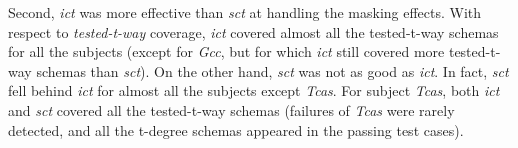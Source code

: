 \documentclass[10pt,journal,compsoc]{IEEEtran}
\begin{document}
Second, \emph{ict} was more effective than \emph{sct} at handling the masking effects. With respect to \emph{tested-t-way} coverage, \emph{ict} covered almost all the tested-t-way schemas for all the subjects (except for \emph{Gcc}, but for which \emph{ict} still covered more tested-t-way schemas than \emph{sct}). On the other hand, \emph{sct} was not as good as \emph{ict}. In fact, \emph{sct} fell behind \emph{ict} for almost all the subjects except \emph{Tcas}. For subject \emph{Tcas}, both \emph{ict} and \emph{sct} covered all the tested-t-way schemas (failures of \emph{Tcas} were rarely detected, and all the t-degree schemas appeared in the passing test cases).

\end{document}
